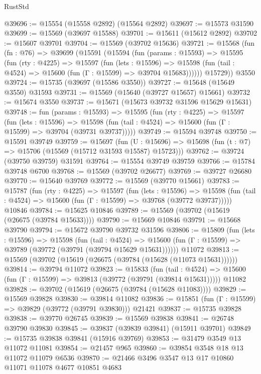 \begin{lexlean}{RustStd}
\begin{coremodule}
@39696 := @15554 (@15558 @2892) (@15564 @2892)
@39697 := @15573 @31590
@39699 := @15569 (@39697 @15588)
@39701 := @15611 (@15612 @2892)
@39702 := @15607 @39701
@39704 := @15569 (@39702 @15636)
@39721 := @15568
    (fun (fn : @76) =>
    @39699
      (@15591
        (@15594
          (fun (params : @15593) =>
          @15595
            (fun (rty : @4225) =>
            @15597
              (fun (lets : @15596) =>
              @15598 (fun (tail : @4524) => @15600 (fun (Γ : @15599) => @39704 @15683))))))
        @15729))
    @3550
@39724 := @15735 (@39697 (@15586 @3550))
@39727 := @15648 (@15649 @3550) @31593
@39731 := @15569 (@15640 (@39727 @15657) @15661)
@39732 := @15674 @3550
@39737 := @15671 (@15673 @39732 @31596 @15629 @15631)
@39748 := fun (params : @15593) =>
  @15595
    (fun (rty : @4225) =>
    @15597
      (fun (lets : @15596) =>
      @15598 (fun (tail : @4524) => @15600 (fun (Γ : @15599) => @39704 (@39731 @39737)))))
@39749 := @15594 @39748
@39750 := @15591 @39749
@39759 := @15697
    (fun (U : @15696) => @15698 (fun (t : @7) => @15706 (@15569 (@15712 @31593 @15587) @15723)))
@39762 := @39724 (@39750 @39759) @31591
@39764 := @15554 @39749 @39759
@39766 := @15784 @39748 @6700
@39768 := @15569 (@39702 @26677)
@39769 := @39727 @26680
@39770 := @15640 @39769
@39772 := @15569 (@39770 @15661)
@39783 := @15787
    (fun (rty : @4225) =>
    @15597
      (fun (lets : @15596) =>
      @15598 (fun (tail : @4524) => @15600 (fun (Γ : @15599) => @39768 (@39772 @39737)))))
    @10846
@39784 := @15625 @10846
@39789 := @15569 (@39702 (@15619 (@26675 (@39784 @15633))))
@39790 := @15669 @10846
@39791 := @15668 @39790
@39794 := @15672 @39790 @39732 @31596
@39806 := @15809
    (fun (lets : @15596) =>
    @15598
      (fun (tail : @4524) =>
      @15600 (fun (Γ : @15599) => @39789 (@39772 (@39791 (@39794 @15629 @15631))))))
    @11072
@39813 := @15569 (@39702 (@15619 (@26675 (@39784 (@15628 (@11073 @15631))))))
@39814 := @39794 @11072
@39823 := @15833
    (fun (tail : @4524) => @15600 (fun (Γ : @15599) => @39813 (@39772 (@39791 (@39814 @15631)))))
    @11082
@39828 := @39702 (@15619 (@26675 (@39784 (@15628 @11083))))
@39829 := @15569 @39828
@39830 := @39814 @11082
@39836 := @15851 (fun (Γ : @15599) => @39829 (@39772 (@39791 @39830))) @21421
@39837 := @15735 @39828
@39838 := @39770 @26745
@39839 := @15569 @39838
@39841 := @26748 @39790 @39830
@39845 := @39837 (@39839 @39841) (@15911 @39701)
@39849 := @15735 @39838 @39841 (@15916 @39769)
@39853 := @31479 @3549 @13 @11072 @11081
@39854 := @21457 @965
@39860 := @39854 @3548 @18 @13 @11072 @11079 @6536
@39870 := @21466 @3496 @3547 @13 @17 @10860 @11071 @11078 @4677 @10851 @4683

\end{coremodule}
\end{lexlean}
